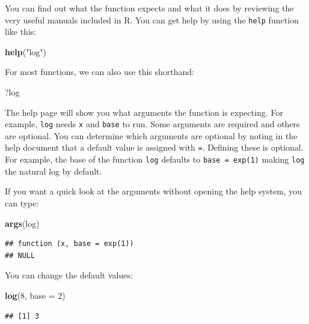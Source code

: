\documentclass[
]{article}
\newenvironment{Shaded}{\begin{snugshade}}{\end{snugshade}}
\newcommand{\AttributeTok}[1]{\textcolor[rgb]{0.13,0.29,0.53}{#1}}
\newcommand{\DecValTok}[1]{\textcolor[rgb]{0.00,0.00,0.81}{#1}}
\newcommand{\FunctionTok}[1]{\textcolor[rgb]{0.13,0.29,0.53}{\textbf{#1}}}
\newcommand{\NormalTok}[1]{#1}
\newcommand{\StringTok}[1]{\textcolor[rgb]{0.31,0.60,0.02}{#1}}
\begin{document}
You can find out what the function expects and what it does by reviewing
the very useful manuals included in R. You can get help by using the
\texttt{help} function like this:

\begin{Shaded}
\begin{Highlighting}[]
\FunctionTok{help}\NormalTok{(}\StringTok{"log"}\NormalTok{)}
\end{Highlighting}
\end{Shaded}

For most functions, we can also use this shorthand:

\begin{Shaded}
\begin{Highlighting}[]
\NormalTok{?log}
\end{Highlighting}
\end{Shaded}

The help page will show you what arguments the function is expecting.
For example, \texttt{log} needs \texttt{x} and \texttt{base} to run.
Some arguments are required and others are optional. You can determine
which arguments are optional by noting in the help document that a
default value is assigned with \texttt{=}. Defining these is optional.
For example, the base of the function \texttt{log} defaults to
\texttt{base\ =\ exp(1)} making \texttt{log} the natural log by default.

If you want a quick look at the arguments without opening the help
system, you can type:

\begin{Shaded}
\begin{Highlighting}[]
\FunctionTok{args}\NormalTok{(log)}
\end{Highlighting}
\end{Shaded}

\begin{verbatim}
## function (x, base = exp(1)) 
## NULL
\end{verbatim}

You can change the default values:

\begin{Shaded}
\begin{Highlighting}[]
\FunctionTok{log}\NormalTok{(}\DecValTok{8}\NormalTok{, }\AttributeTok{base =} \DecValTok{2}\NormalTok{)}
\end{Highlighting}
\end{Shaded}

\begin{verbatim}
## [1] 3
\end{verbatim}
\end{document}
